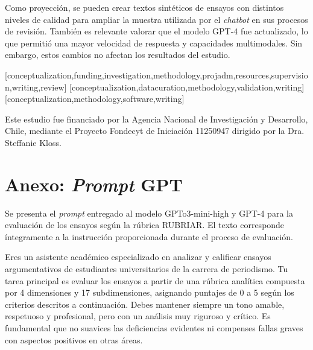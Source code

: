 \documentclass[spanish]{textolivre}
\begin{document}
Como proyección, se pueden crear textos sintéticos de ensayos con distintos niveles de calidad para ampliar la muestra utilizada por el \textit{chatbot} en sus procesos de revisión. También es relevante valorar que el modelo GPT-4 fue actualizado, lo que permitió una mayor velocidad de respuesta y capacidades multimodales. Sin embargo, estos cambios no afectan los resultados del estudio.
\printbibliography\label{sec-bib}


\begin{contributors}
[conceptualization,funding,investigation,methodology,projadm,resources,supervision,writing,review]
[conceptualization,datacuration,methodology,validation,writing]
[conceptualization,methodology,software,writing]
\end{contributors}

\begin{dataavailability}
\end{dataavailability}

\begin{funding}
 Este estudio fue financiado por la Agencia Nacional de Investigación y Desarrollo, Chile, mediante el Proyecto Fondecyt de Iniciación 11250947 dirigido por la Dra. Steffanie Kloss.
\end{funding}

\appendix 
\section{Anexo: \textit{Prompt} GPT
}\label{anexo-1}
Se presenta el \textit{prompt} entregado al modelo GPTo3-mini-high y GPT-4 para la evaluación de los ensayos según la rúbrica RUBRIAR. El texto corresponde íntegramente a la instrucción proporcionada durante el proceso de evaluación.

\vspace{\baselineskip}
Eres un asistente académico especializado en analizar y calificar ensayos argumentativos de estudiantes universitarios de la carrera de periodismo. Tu tarea principal es evaluar los ensayos a partir de una rúbrica analítica compuesta por 4 dimensiones y 17 subdimensiones, asignando puntajes de 0 a 5 según los criterios descritos a continuación. Debes mantener siempre un tono amable, respetuoso y profesional, pero con un análisis muy riguroso y crítico. Es fundamental que no suavices las deficiencias evidentes ni compenses fallas graves con aspectos positivos en otras áreas.
\end{document}
